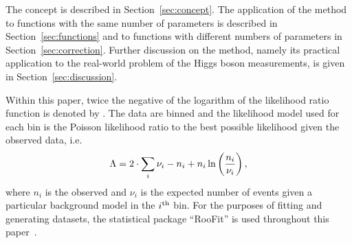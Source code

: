The concept is described in Section~\ref{sec:concept}.
The application of the method to functions with the same number of parameters
is described in Section~\ref{sec:functions} and to functions with different
numbers of parameters in Section~\ref{sec:correction}. Further discussion on
the method, namely its practical application to the real-world problem of
the Higgs boson measurements, is given in Section~\ref{sec:discussion}.

Within this paper, twice the negative of the logarithm of the likelihood ratio 
function is denoted by \nll. The data are binned and the
likelihood model used for each bin is the Poisson likelihood ratio to the best
possible likelihood given the observed data, i.e.
\begin{displaymath}
\Lambda = 2\cdot\sum_{i} \nu_i - n_i + n_i \ln\left(\frac{n_i}{\nu_i}\right),
\end{displaymath}
where $n_{i}$ is the observed and $\nu_{i}$ is the expected number of events
given a particular background model in the $i^{\rm th}$ bin.
For the purposes of fitting and generating datasets, the statistical package
``RooFit'' is used throughout this paper~\cite{ref:roofit}.

